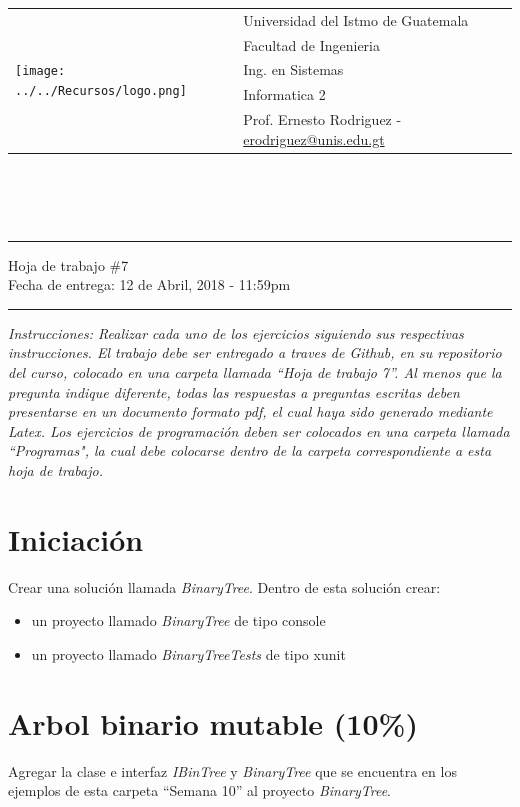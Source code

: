 \documentclass{article}
\newcommand{\horrule}[1]{\rule{\linewidth}{#1}}
\begin{document}
\begin{tabular}{l l}
\multirow{5}{*}{\texttt{[image: ../../Recursos/logo.png]}} & Universidad del Istmo de Guatemala \\
 & Facultad de Ingenieria \\
 & Ing. en Sistemas \\
 & Informatica 2 \\
 & Prof. Ernesto Rodriguez - \href{mailto:erodriguez@unis.edu.gt}{erodriguez@unis.edu.gt} \\
\end{tabular}
\\\\\\

\begin{center}
        \horrule{0.5pt}
        \huge{Hoja de trabajo \#7} \\
        \large{Fecha de entrega: 12 de Abril, 2018 - 11:59pm} \\
        \horrule{1pt}
\end{center}
\emph{Instrucciones: Realizar cada uno de los ejercicios siguiendo sus respectivas
instrucciones. El trabajo debe ser entregado a traves de Github, en su repositorio del curso, colocado en una carpeta llamada ``Hoja de trabajo 7''.
Al menos que la pregunta indique diferente, todas las respuestas a preguntas escritas deben presentarse en
un documento formato pdf, el cual haya sido generado mediante Latex. Los ejercicios de programaci\'on deben ser colocados en una carpeta
llamada ``Programas", la cual debe colocarse dentro de la carpeta correspondiente a esta hoja de trabajo.}

\section*{Iniciaci\'on}

Crear una soluci\'on llamada \emph{BinaryTree}. Dentro de esta soluci\'on crear:
\begin{itemize}
        \item{un proyecto llamado \emph{BinaryTree} de tipo console}
        \item{un proyecto llamado \emph{BinaryTreeTests} de tipo xunit}
\end{itemize}

\section*{Arbol binario mutable (10\%)}
Agregar la clase e interfaz \emph{IBinTree} y \emph{BinaryTree} que se encuentra en los ejemplos
de esta carpeta ``Semana 10'' al proyecto \emph{BinaryTree}.
\end{document}
